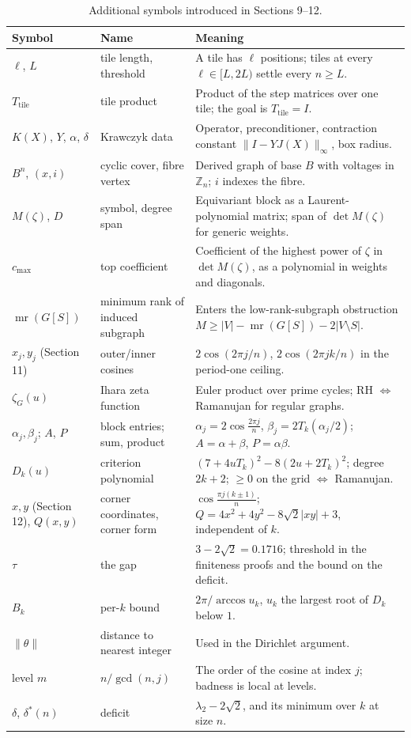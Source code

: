 \documentclass[11pt]{article}
\begin{document}
\begin{table}[htbp]
\centering\small
\caption{Additional symbols introduced in Sections 9--12.}
\label{tab:variables2}
\begin{tabular}{p{3.2cm}p{3.4cm}p{8.6cm}}
\toprule
\textbf{Symbol} & \textbf{Name} & \textbf{Meaning} \\
\midrule
$\ell$, $L$ & tile length, threshold & A tile has $\ell$ positions; tiles at every $\ell\in[L,2L)$ settle every $n\ge L$. \\
$T_{\text{tile}}$ & tile product & Product of the step matrices over one tile; the goal is $T_{\text{tile}}=I$. \\
$K(X)$, $Y$, $\alpha$, $\delta$ & Krawczyk data & Operator, preconditioner, contraction constant $\|I-YJ(X)\|_\infty$, box radius. \\
$B^n$, $(x,i)$ & cyclic cover, fibre vertex & Derived graph of base $B$ with voltages in $\mathbb Z_n$; $i$ indexes the fibre. \\
$M(\zeta)$, $D$ & symbol, degree span & Equivariant block as a Laurent-polynomial matrix; span of $\det M(\zeta)$ for generic weights. \\
$c_{\max}$ & top coefficient & Coefficient of the highest power of $\zeta$ in $\det M(\zeta)$, as a polynomial in weights and diagonals. \\
$\operatorname{mr}(G[S])$ & minimum rank of induced subgraph & Enters the low-rank-subgraph obstruction $M\ge|V|-\operatorname{mr}(G[S])-2|V\setminus S|$. \\
$x_j, y_j$ (Section 11) & outer/inner cosines & $2\cos(2\pi j/n)$, $2\cos(2\pi jk/n)$ in the period-one ceiling. \\
$\zeta_G(u)$ & Ihara zeta function & Euler product over prime cycles; RH $\iff$ Ramanujan for regular graphs. \\
$\alpha_j,\beta_j$; $A$, $P$ & block entries; sum, product & $\alpha_j=2\cos\frac{2\pi j}{n}$, $\beta_j=2T_k(\alpha_j/2)$; $A=\alpha+\beta$, $P=\alpha\beta$. \\
$D_k(u)$ & criterion polynomial & $(7+4uT_k)^2-8(2u+2T_k)^2$; degree $2k+2$; $\ge0$ on the grid $\iff$ Ramanujan. \\
$x,y$ (Section 12), $Q(x,y)$ & corner coordinates, corner form & $\cos\frac{\pi j(k\pm1)}{n}$; $Q=4x^2+4y^2-8\sqrt2|xy|+3$, independent of $k$. \\
$\tau$ & the gap & $3-2\sqrt2=0.1716$; threshold in the finiteness proofs and the bound on the deficit. \\
$B_k$ & per-$k$ bound & $2\pi/\arccos u_k$, $u_k$ the largest root of $D_k$ below $1$. \\
$\|\theta\|$ & distance to nearest integer & Used in the Dirichlet argument. \\
level $m$ & $n/\gcd(n,j)$ & The order of the cosine at index $j$; badness is local at levels. \\
$\delta$, $\delta^\ast(n)$ & deficit & $\lambda_2-2\sqrt2$, and its minimum over $k$ at size $n$. \\
\bottomrule
\end{tabular}
\end{table}
\end{document}
